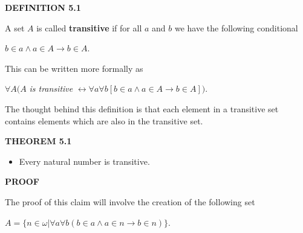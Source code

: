 \documentclass[12pt, a4paper]{article}
\begin{document}
\noindent\blacksquare\textbf{ DEFINITION 5.1}\par

\vspace{4mm}

A set $A$ is called \textbf{transitive} if for all $a$ and $b$ we have the following conditional\par

\vspace{4mm}

\centerline{$b\in a\wedge a\in A\rightarrow b\in A$.}

\vspace{4mm}

This can be written more formally as\par

\vspace{4mm}

\centerline{$\forall A(A$\textit{ is transitive }$\leftrightarrow\forall a\forall b[b\in a\wedge a\in A\rightarrow b\in A])$.}

\vspace{4mm}

\noindent The thought behind this definition is that each element in a transitive set contains elements which are also in the transitive set.\par

\vspace{4mm}

\noindent\blacksquare\textbf{ THEOREM 5.1}\par

\begin{itemize}

    \item Every natural number is transitive.
    
\end{itemize}

\noindent\textbf{PROOF}\par

\vspace{4mm}

\noindent The proof of this claim will involve the creation of the following set\par

\vspace{4mm}

\centerline{$A=\{n\in\omega$\hspace{1mm}$ | $\hspace{1mm}$\forall a\forall b(b\in a\wedge a\in n\rightarrow b\in n)\}$.}
\end{document}
